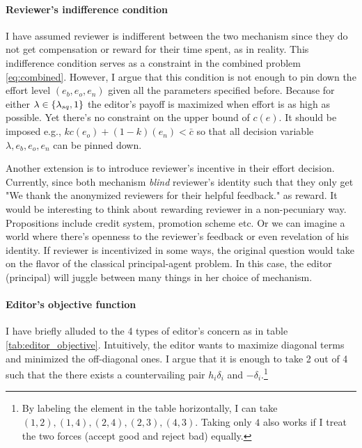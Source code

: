 \documentclass[12pt]{article}
\begin{document}
\paragraph{Reviewer's indifference condition} I have assumed reviewer is indifferent between the two mechanism since they do
not get compensation or reward for their time spent, as in reality. This
indifference condition serves as a constraint in the combined problem
\ref{eq:combined}. However, I argue that this condition is not enough to pin
down the effort level $(e_b, e_o, e_n)$ given all the parameters specified
before. Because for either $\lambda\in \left\{\lambda_{sq},1\right\}$ the editor's
payoff is maximized when effort is as high as possible. Yet there's no
constraint on the upper bound of $c(e)$. It should be imposed e.g.,
$kc(e_o)+(1-k)(e_n)<\bar{c}$ so that all decision variable $\lambda, e_b, e_o,
    e_n$ can be pinned down.

Another extension is to introduce reviewer's incentive in their effort
decision. Currently, since both mechanism \textit{blind} reviewer's identity
such that they only get "We thank the anonymized reviewers for their helpful
feedback." as reward. It would be interesting to think about rewarding reviewer
in a non-pecuniary way. Propositions include credit system, promotion scheme
etc. Or we can imagine a world where there's openness to the reviewer's
feedback or even revelation of his identity. If reviewer is incentivized in
some ways, the original question would take on the flavor of the classical
principal-agent problem. In this case, the editor (principal) will juggle
between many things in her choice of mechanism.

\paragraph{Editor's objective function}
I have briefly alluded to the 4 types of editor's concern as in table
\ref{tab:editor_objective}. Intuitively, the editor wants to maximize diagonal
terms and minimized the off-diagonal ones. I argue that it is enough to take 2
out of 4 such that the there exists a countervailing pair $h_i\delta_i$ and
$-\delta_i$.\footnote{By labeling the element in the table horizontally, I can
    take $(1,2),(1,4),(2,4),(2,3),(4,3)$. Taking only $4$ also works if I treat the
    two forces (accept good and reject bad) equally.} \pagebreak \newpage

\end{document}
